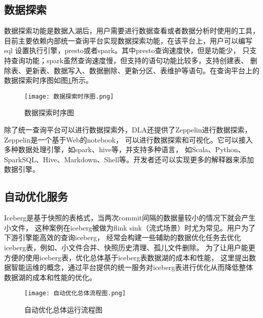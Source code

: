 \subsection{数据探索}

数据探索功能是数据入湖后，用户需要进行数据查看或者数据分析时使用的工具，
目前主要依赖内部统一查询平台实现数据探索功能，在该平台上，用户可以编写sql
设置执行引擎，presto或者spark。其中presto查询速度快，但是功能少，
只支持查询功能；spark虽然查询速度慢，但支持的语句功能比较多，支持创建表、
删除表、更新表、数据写入、数据删除、更新分区、表维护等语句。在查询平台上的数据探索时序图如图\ref{fig:数据探索时序图}所示。

\begin{figure}[H]
  \centering
  \texttt{[image: 数据探索时序图.png]}
  \caption{数据探索时序图}
  \label{fig:数据探索时序图}
\end{figure}

除了统一查询平台可以进行数据探索外，DLA还提供了Zeppelin进行数据探索，Zeppelin是一个基于Web的notebook，
可以进行数据探索和可视化。它可以接入多种数据处理引擎，如spark、hive等，并支持多种语言，
如Scala、Python、SparkSQL、Hive、Markdown、Shell等。开发者还可以实现更多的解释器来添加数据引擎。

\subsection{自动优化服务}

Iceberg是基于快照的表格式，当两次commit间隔的数据量较小的情况下就会产生小文件，
这种案例在iceberg被做为flink sink（流式场景）时尤为常见。用户为了下游引擎能高效的查询iceberg，
经常会构建一些辅助的数据优化任务去优化iceberg表，例如、小文件合并、快照历史清理、孤儿文件删除。
为了让用户能更方便的使用iceberg表，优化总体基于iceberg表数据湖的成本和性能，
这里提出数据智能运维的概念，通过平台提供的统一服务对iceberg表进行优化从而降低整体数据湖的成本和性能的优化。

\begin{figure}[H]
  \centering
  \texttt{[image: 自动优化总体流程图.png]}
  \caption{自动优化总体运行流程图}
  \label{fig:自动优化总体运行流程图}
\end{figure}

